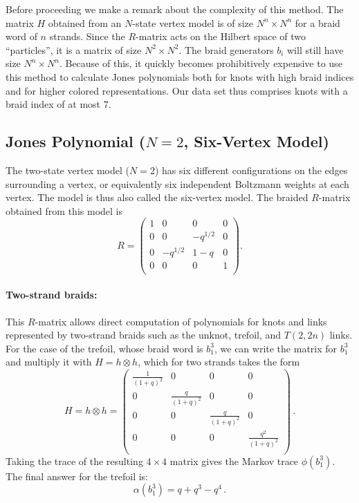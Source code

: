 \documentclass[11pt]{article}
\begin{document}
Before proceeding we make a remark about the complexity of this method. The matrix $H$ obtained from an $N$-state vertex model is of size $N^n\times N^n$ for a braid word of $n$ strands. Since the $R$-matrix acts on the Hilbert space of two ``particles'', it is a matrix of size $N^2\times N^2$. The braid generators $b_i$ will still have size $N^n\times N^n$. Because of this, it quickly becomes prohibitively expensive to use this method to calculate Jones polynomials both for knots with high braid indices and for higher colored representations. Our data set thus comprises knots with a braid index of at most $7$.

\subsection{Jones Polynomial ($N=2$, Six-Vertex Model)}

The two-state vertex model ($N=2$) has six different configurations on the edges surrounding a vertex, or equivalently six independent Boltzmann weights at each vertex. The model is thus also called the six-vertex model. The braided $R$-matrix obtained from this model is
\begin{equation}
R = \left(
\begin{array}{cccc}
 1 & 0 & 0 & 0 \\
 0 & 0 & -q^{1/2} & 0 \\
 0 & -q^{1/2} & 1-q & 0 \\
 0 & 0 & 0 & 1 \\
\end{array}
\right).
\end{equation}

\paragraph{Two-strand braids:} This $R$-matrix allows direct computation of polynomials for knots and links represented by two-strand braids such as the unknot, trefoil, and \(T(2, 2n)\) links. For the case of the trefoil, whose braid word is \(b_1^3\), we can write the matrix for \(b_1^3\) and multiply it with $H=h \otimes h$, which for two strands takes the form
\begin{equation}
H = h \otimes h = \begin{pmatrix}
 \frac{1}{(1+q)^2} & 0 & 0 & 0 \\
 0 & \frac{q}{(1+q)^2} & 0 & 0 \\
 0 & 0 & \frac{q}{(1+q)^2} & 0 \\
 0 & 0 & 0 & \frac{q^2}{(1+q)^2} \\
\end{pmatrix} \,.
\end{equation}
Taking the trace of the resulting \(4 \times 4\) matrix gives the Markov trace \(\phi(b_1^3)\). The final answer for the trefoil is:
\begin{equation}
\alpha(b_1^3) = q + q^3 - q^4 \,.
\end{equation}
\end{document}
